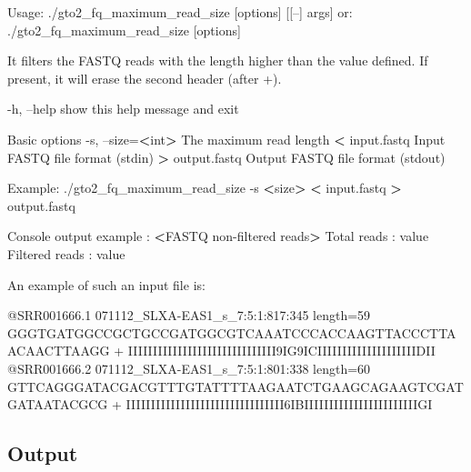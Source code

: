 \documentclass[11pt,]{krantz}
\newenvironment{Shaded}{\begin{snugshade}}{\end{snugshade}}
\newcommand{\OperatorTok}[1]{\textcolor[rgb]{0.43,0.43,0.43}{\textbf{#1}}}
\newcommand{\ExtensionTok}[1]{#1}
\newcommand{\NormalTok}[1]{#1}
\begin{document}
\begin{Shaded}
\begin{Highlighting}[]
\ExtensionTok{Usage}\NormalTok{: ./gto2_fq_maximum_read_size [options] [[--] args]}
   \ExtensionTok{or}\NormalTok{: ./gto2_fq_maximum_read_size [options]}

\ExtensionTok{It}\NormalTok{ filters the FASTQ reads with the length higher than the }
\ExtensionTok{value}\NormalTok{ defined. }
\ExtensionTok{If}\NormalTok{ present, it will erase the second header (after +)}\ExtensionTok{.}

    \ExtensionTok{-h}\NormalTok{, --help            show this help message and exit}

\ExtensionTok{Basic}\NormalTok{ options}
    \ExtensionTok{-s}\NormalTok{, --size=}\OperatorTok{<}\NormalTok{int}\OperatorTok{>}\NormalTok{      The maximum read length}
    \OperatorTok{<} \ExtensionTok{input.fastq}\NormalTok{         Input FASTQ file format (stdin)}
    \OperatorTok{>} \ExtensionTok{output.fastq}\NormalTok{        Output FASTQ file format (stdout)}

\ExtensionTok{Example}\NormalTok{: ./gto2_fq_maximum_read_size -s }\OperatorTok{<}\NormalTok{size}\OperatorTok{>} \OperatorTok{<}\NormalTok{ input.fastq }
\OperatorTok{>} \ExtensionTok{output.fastq}

\ExtensionTok{Console}\NormalTok{ output example :}
\OperatorTok{<}\ExtensionTok{FASTQ}\NormalTok{ non-filtered reads}\OperatorTok{>}
\ExtensionTok{Total}\NormalTok{ reads    : value}
\ExtensionTok{Filtered}\NormalTok{ reads : value}
\end{Highlighting}
\end{Shaded}

An example of such an input file is:

\begin{Shaded}
\begin{Highlighting}[]
\ExtensionTok{@SRR001666.1}\NormalTok{ 071112_SLXA-EAS1_s_7:5:1:817:345 length=59}
\ExtensionTok{GGGTGATGGCCGCTGCCGATGGCGTCAAATCCCACCAAGTTACCCTTAACAACTTAAGG}
\ExtensionTok{+}
\ExtensionTok{IIIIIIIIIIIIIIIIIIIIIIIIIIIIII9IG9ICIIIIIIIIIIIIIIIIIIIIDII}
\ExtensionTok{@SRR001666.2}\NormalTok{ 071112_SLXA-EAS1_s_7:5:1:801:338 length=60}
\ExtensionTok{GTTCAGGGATACGACGTTTGTATTTTAAGAATCTGAAGCAGAAGTCGATGATAATACGCG}
\ExtensionTok{+}
\ExtensionTok{IIIIIIIIIIIIIIIIIIIIIIIIIIIIIIII6IBIIIIIIIIIIIIIIIIIIIIIIIGI}
\end{Highlighting}
\end{Shaded}

\subsection*{Output}\label{output-5}
\end{document}
